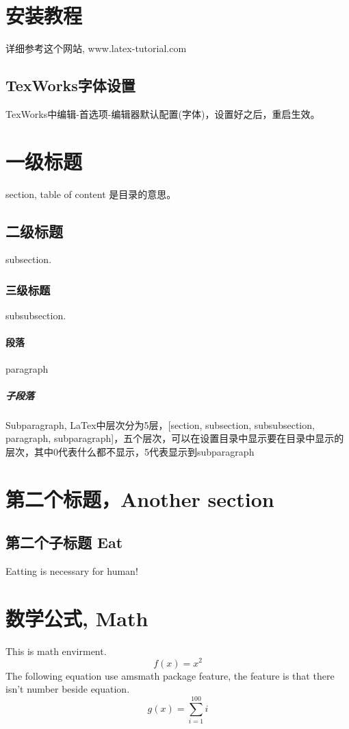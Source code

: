\section{安装教程}
详细参考这个网站, www.latex-tutorial.com
\subsection{TexWorks字体设置}
TexWorks中编辑-首选项-编辑器默认配置(字体)，设置好之后，重启生效。
\section{一级标题}
section, table of content 是目录的意思。
\subsection{二级标题}
subsection.
\subsubsection{三级标题}
subsubsection. 
\paragraph{段落}
paragraph
\subparagraph{子段落}
Subparagraph, 
LaTex中层次分为5层，[section, subsection, subsubsection, paragraph, subparagraph]，五个层次，可以在设置目录中显示要在目录中显示的层次，其中0代表什么都不显示，5代表显示到subparagraph
\section{第二个标题，Another section}
\subsection{第二个子标题 Eat}
Eatting is necessary for human!
\section{数学公式, Math}
This is math envirment.
\begin{equation}
f(x)=x^2
\end{equation}
The following equation use amsmath package feature, the feature is that there isn't number beside equation.
\begin{equation*}
g(x)=\sum_{i=1}^{100}i
\end{equation*}
